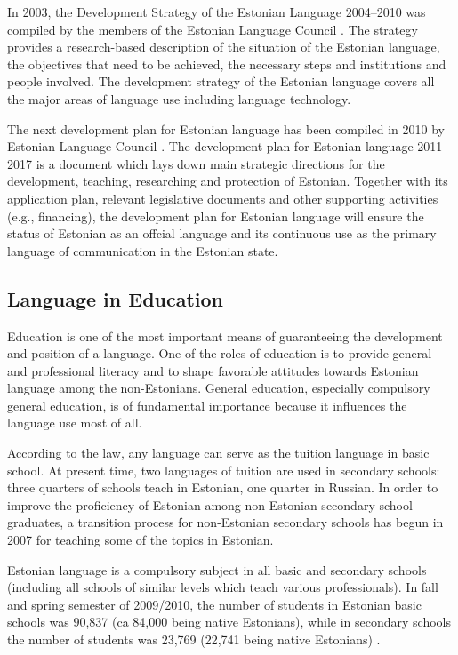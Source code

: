 \documentclass[]{../metanetpaper}
\begin{document}
\begin{multicols}{2}
In 2003, the Development Strategy of the Estonian Language 2004--2010 was compiled by the members of the Estonian Language Council \cite{KeeleStratEn}. 
The strategy provides a research-based description of the situation of the Estonian language, the objectives that need to be achieved, the necessary steps and institutions and people involved. 
The development strategy of the Estonian language covers all the major areas of language use including language technology.

The next development plan for Estonian language has been compiled in 2010 by Estonian Language Council \cite{DevPlan}. 
The development plan for Estonian language 2011--2017 is a document which lays down main strategic directions for the development, teaching, researching and protection of Estonian. 
Together with its application plan, relevant legislative documents and other supporting activities (e.g., ﬁnancing), the development plan for Estonian language will ensure the status of Estonian as an offcial language and its continuous use as the primary language of communication in the Estonian state.

\subsection{Language in Education}

Education is one of the most important means of guaranteeing the development and position of a language. 
One of the roles of education is to provide general and professional literacy and to shape favorable attitudes towards Estonian language among the non-Estonians. 
General education, especially compulsory general education, is of fundamental importance because it inﬂuences the language use most of all.

According to the law, any language can serve as the tuition language in basic school. 
At present time, two languages of tuition are used in secondary schools: three quarters of schools teach in Estonian, one quarter in Russian. 
In order to improve the proﬁciency of Estonian among non-Estonian secondary school graduates, a transition process for non-Estonian secondary schools has begun in 2007 for teaching some of the topics in Estonian.

Estonian language is a compulsory subject in all basic and secondary schools (including all schools of similar levels which teach various professionals). 
In fall and spring semester of 2009/2010, the number of students in Estonian basic schools was 90,837 (ca 84,000 being native Estonians), while in secondary schools the number of students was 23,769 (22,741 being native Estonians) \cite{DevPlan}.


\end{multicols}
\end{document}
